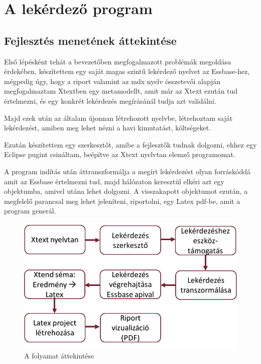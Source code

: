 \chapter{A lekérdező program}\label{sect:Ellaboration}
\section{Fejlesztés menetének áttekintése}
Első lépésként tehát a bevezetőben megfogalmazott problémák megoldása érdekében,
készítettem egy saját magas szintű lekérdező nyelvet az Essbase-hez, mégpedig
úgy, hogy a riport valamint az mdx nyelv összetevői alapján megfogalmaztam
Xtextben egy metamodellt, amit már az Xtext ezután tud értelmezni, és egy
konkrét lekérdezés megírásánál tudja azt validálni.

Majd ezek után az általam újonnan létrehozott nyelvbe, létrehoztam saját
lekérdezést, amiben meg lehet nézni a havi kimutatást, költségeket.

Ezután készítettem egy szerkesztőt, amibe a fejlesztők tudnak dolgozni, ehhez
egy Eclipse pugint csináltam, beépítve az Xtext nyelvtan elemző programomat. 

A program indítás után áttranszformálja a megírt lekérdezést olyan forráskóddá
amit az Essbase értelmezni tud, majd hálózaton keresztül elkéri azt egy
objektumba, amivel utána lehet dolgozni. A visszakapott objektumot ezután, a
megfelelő parancsal meg lehet jeleníteni, riportolni, egy Latex pdf-be,
amit a program generál.

 \begin{figure}[!ht]
\centering
\includegraphics[width=120mm, keepaspectratio]{figures/overview.png}
\caption{A folyamat áttekintése} 
\label{fig:Overview}
\end{figure}

